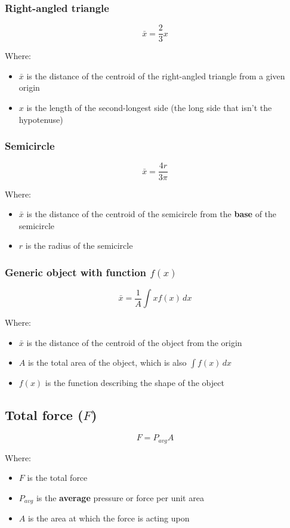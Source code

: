 \documentclass[11pt]{article}
\begin{document}
\subsubsection{Right-angled triangle}
\label{sec:org0bc15c6}
\[\bar{x} = \frac{2}{3} x\]

Where:
\begin{itemize}
\item \(\bar{x}\) is the distance of the centroid of the right-angled triangle from a given origin
\item \(x\) is the length of the second-longest side (the long side that isn't the hypotenuse)
\end{itemize}

\subsubsection{Semicircle}
\label{sec:org3c625f2}
\[\bar{x} = \frac{4r}{3\pi}\]

Where:
\begin{itemize}
\item \(\bar{x}\) is the distance of the centroid of the semicircle from the \textbf{base} of the semicircle
\item \(r\) is the radius of the semicircle
\end{itemize}

\subsubsection{Generic object with function \(f(x)\)}
\label{sec:org752658c}
\[\bar{x} = \frac{1}{A} \int x f(x) \, dx\]

Where:
\begin{itemize}
\item \(\bar{x}\) is the distance of the centroid of the object from the origin
\item \(A\) is the total area of the object, which is also \(\int f(x) \, dx\)
\item \(f(x)\) is the function describing the shape of the object
\end{itemize}

\subsection{Total force (\(F\))}
\label{sec:orgaf3b863}
\[F = P_{avg} A\]

Where:
\begin{itemize}
\item \(F\) is the total force
\item \(P_{avg}\) is the \textbf{average} pressure or force per unit area
\item \(A\) is the area at which the force is acting upon
\end{itemize}
\end{document}
